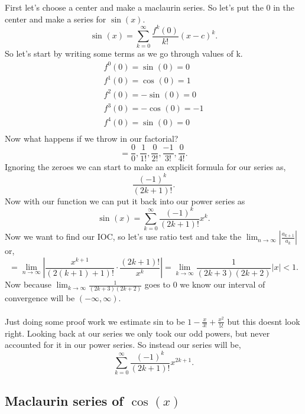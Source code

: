 \documentclass{report}
\begin{document}
	First let's choose a center and make a maclaurin series. So let's put the 0 in the center and make a series for $ \sin\left( x \right)  $.
	\[
	\sin^{  } \left( x \right) = \sum_{ k=0 } ^{ \infty } \frac{ f^{ k }\left( 0 \right)  }{ k! }\left( x-c \right) ^{ k }
	.\] 
	So let's start by writing some terms as we go through values of k. 
	\begin{gather*}
	f^{ 0 }\left( 0 \right) =\sin^{  } \left( 0 \right) =0 \\
	f^{ 1 }\left( 0 \right) =\cos^{  } \left( 0 \right) =1 \\
	f^{ 2 }\left( 0 \right) =-\sin^{  } \left( 0 \right) =0 \\
	f^{ 3 }\left( 0 \right) =-\cos^{  } \left( 0 \right) =-1 \\
	f^{ 4 }\left( 0 \right) =\sin^{  } \left( 0 \right) =0 \\
	\end{gather*}
	Now what happens if we throw in our factorial?
	\[
	=\frac{ 0 }{ 0 } , \frac{ 1 }{ 1! }, \frac{ 0 }{ 2! }, \frac{ -1 }{ 3! }, \frac{ 0 }{ 4! }
	.\] 
	Ignoring the zeroes we can start to make an explicit formula for our series as,
	\[
	\frac{ \left( -1 \right) ^{ k } }{ \left( 2k+1 \right) ! }
	.\] 
	Now with our function we can put it back into our power series as
	\[
	\sin^{  } \left( x \right) =\sum_{ k=0 } ^{ \infty } \frac{ \left( -1 \right) ^{ k } }{ \left( 2k+1 \right) ! }x^{ k }
	.\] 
	Now we want to find our IOC, so let's use ratio test and take the $ \lim_{ n \to \infty} \left| \frac{ a_{ k+1 } }{ a_k } \right| $ or,
	\[
	=\lim_{ n \to \infty} \left| \frac{ x^{ k+1 } }{ \left( 2\left( k+1 \right) +1 \right) ! }\cdot \frac{ \left( 2k+1 \right) ! }{ x^{ k } } \right| = \lim_{ k \to \infty} \frac{ 1 }{ \left( 2k+3 \right) \left( 2k+2 \right)  } \left| x \right|<1
	.\] 
	Now because $ \lim_{ k \to \infty} \frac{ 1 }{ \left( 2k+3 \right) \left( 2k+2 \right)  }  $ goes to 0 we know our interval of convergence will be $ \left( -\infty,\infty \right)  $.  \\ \\ 
	Just doing some proof work we estimate sin to be $ 1-\frac{ x }{ 3! } +\frac{ x^2 }{ 5! }  $ but this doesnt look right. Looking back at our series we only took our odd powers, but never accounted for it in our power series. So instead our series will be,
	\[
	\sum_{ k=0 } ^{ \infty } \frac{ \left( -1 \right) ^{ k } }{ \left( 2k+1 \right) ! }x^{ 2k+1 }
	.\] 

\subsection*{Maclaurin series of $ \cos^{  } \left( x \right)  $}%
\end{document}

